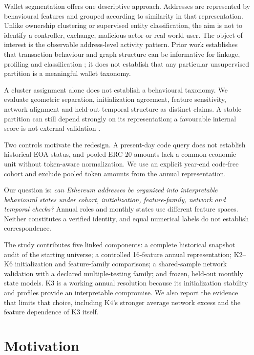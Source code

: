 Wallet segmentation offers one descriptive approach. Addresses are represented by behavioural features and grouped according to similarity in that representation. Unlike ownership clustering or supervised entity classification, the aim is not to identify a controller, exchange, malicious actor or real-world user. The object of interest is the observable address-level activity pattern. Prior work establishes that transaction behaviour and graph structure can be informative for linkage, profiling and classification \cite{victor2020address,beres2021blockchain,bonifazi2022userspectra}; it does not establish that any particular unsupervised partition is a meaningful wallet taxonomy.

A cluster assignment alone does not establish a behavioural taxonomy. We evaluate geometric separation, initialization agreement, feature sensitivity, network alignment and held-out temporal structure as distinct claims. A stable partition can still depend strongly on its representation; a favourable internal score is not external validation \cite{halkidi2001validation,liu2022stability}.

Two controls motivate the redesign. A present-day code query does not establish historical EOA status, and pooled ERC-20 amounts lack a common economic unit without token-aware normalization. We use an explicit year-end code-free cohort and exclude pooled token amounts from the annual representation.

Our question is: \emph{can Ethereum addresses be organized into interpretable behavioural states under cohort, initialization, feature-family, network and temporal checks?} Annual roles and monthly states use different feature spaces. Neither constitutes a verified identity, and equal numerical labels do not establish correspondence.

The study contributes five linked components: a complete historical snapshot audit of the starting universe; a controlled 16-feature annual representation; K2--K6 initialization and feature-family comparisons; a shared-sample network validation with a declared multiple-testing family; and frozen, held-out monthly state models. K3 is a working annual resolution because its initialization stability and profiles provide an interpretable compromise. We also report the evidence that limits that choice, including K4's stronger average network excess and the feature dependence of K3 itself.

\section{Motivation}
